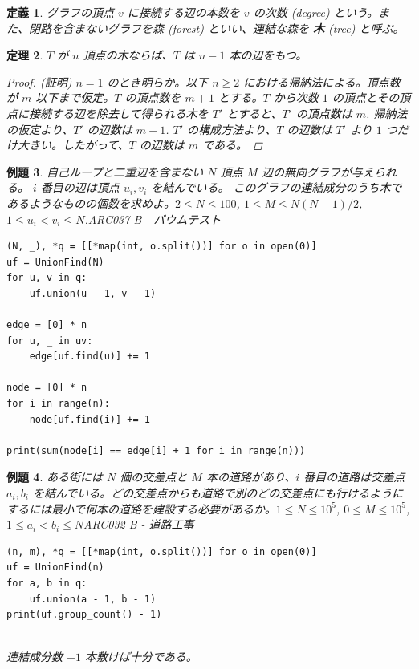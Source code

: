 \documentclass[12pt, a4j]{ltjsarticle}
\newtheorem{thm}{定理}
\newtheorem{defi}[thm]{定義}
\newtheorem{exm}[thm]{例題}
\newcommand*{\SS}{\vspace{1cm}}
\begin{document}
\begin{defi}
グラフの頂点 $v$ に接続する辺の本数を $v$ の次数 (degree) という。また、閉路を含まないグラフを森 (forest) といい、連結な森を {\bf 木} (tree) と呼ぶ。
\end{defi}

\SS

\begin{thm}
$T$ が $n$ 頂点の木ならば、$T$ は $n − 1$ 本の辺をもつ。
\begin{proof} (証明) $n=1$ のとき明らか。以下 $n\ge 2$ における帰納法による。頂点数が $m$
以下まで仮定。$T$ の頂点数を $m + 1$ とする。$T$ から次数 $1$ の頂点とその頂点に接続する辺を除去して得られる木を $T'$ とすると、$T'$ の頂点数は $m$. 帰納法の仮定より、$T'$ の辺数は $m − 1$. $T'$ の構成方法より、$T$ の辺数は $T'$ より $1$ つだけ大きい。したがって、$T$ の辺数は $m$ である。

\end{proof}
\end{thm}
\begin{exm}
自己ループと二重辺を含まない $N$ 頂点 $M$ 辺の無向グラフが与えられる。 $i$ 番目の辺は頂点 $u_i,v_i$ を結んでいる。 このグラフの連結成分のうち木であるようなものの個数を求めよ。$2\le N \le 100$, $1\le M \le N(N-1)/2$, $1\le u_i < v_i \le N$.\quad\upshape ARC037 B - バウムテスト\\
\begin{lstlisting}
(N, _), *q = [[*map(int, o.split())] for o in open(0)]
uf = UnionFind(N)
for u, v in q:
    uf.union(u - 1, v - 1)

edge = [0] * n
for u, _ in uv:
    edge[uf.find(u)] += 1

node = [0] * n
for i in range(n):
    node[uf.find(i)] += 1

print(sum(node[i] == edge[i] + 1 for i in range(n)))
\end{lstlisting}
\end{exm}

\newpage

\begin{exm} ある街には $N$ 個の交差点と $M$ 本の道路があり、$i$ 番目の道路は交差点 $a_i,b_i$ を結んでいる。どの交差点からも道路で別のどの交差点にも行けるようにするには最小で何本の道路を建設する必要があるか。$1 \le N \le 10^5$, $0 \le M \le 10^5$, $1 \le a_i < b_i \le N$\upshape\quad ARC032 B - 道路工事\\
\begin{lstlisting}
(n, m), *q = [[*map(int, o.split())] for o in open(0)]
uf = UnionFind(n)
for a, b in q:
    uf.union(a - 1, b - 1)
print(uf.group_count() - 1)
\end{lstlisting}\quad\\
連結成分数 $-1$ 本敷けば十分である。
\end{exm}
\end{document}
